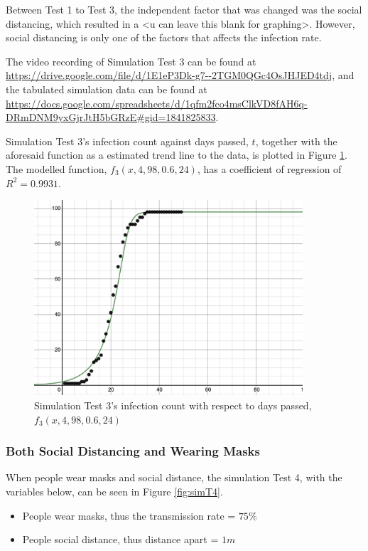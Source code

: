 \documentclass[a4paper,titlepage]{article}
\begin{document}
Between Test 1 to Test 3, the independent factor that was changed was the social distancing, which resulted in a <u can leave this blank for graphing>. However, social distancing is only one of the factors that affects the infection rate.

The video recording of Simulation Test 3 can be found at \url{https://drive.google.com/file/d/1E1eP3Dk-g7--2TGM0QGc4OsJHJED4tdj}, and the tabulated simulation data can be found at \url{https://docs.google.com/spreadsheets/d/1qfm2fco4msClkVD8fAH6q-DRmDNM9yxGjrJtH5bGRzE#gid=1841825833}.

Simulation Test 3's infection count against days passed, $t$, together with the aforesaid function as a estimated trend line to the data, is plotted in Figure \ref{fig:simG3}. The modelled function, $f_3(x,4,98,0.6,24)$, has a coefficient of regression of $R^2=0.9931$.

\begin{figure}[htbp]
    \centering
    \includegraphics[width=10cm]{simG3.png}
    \caption{Simulation Test 3's infection count with respect to days passed, $f_3(x,4,98,0.6,24)$}
    \label{fig:simG3}
\end{figure}

\subsubsection{Both Social Distancing and Wearing Masks}

When people wear masks and social distance, the simulation Test 4, with the variables below, can be seen in Figure \ref{fig:simT4}.

\begin{itemize}
    \item People wear masks, thus the transmission rate = $75\%$
    \item People social distance, thus distance apart = $1\si{m}$
\end{itemize}
\end{document}
